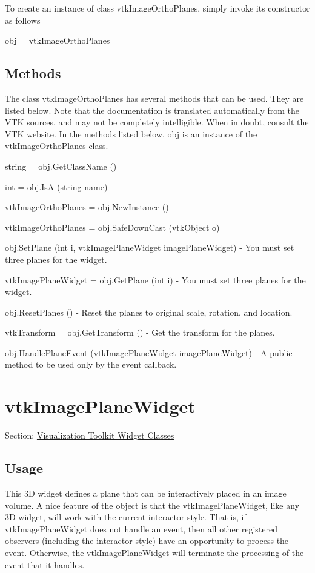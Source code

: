 To create an instance of class vtk\-Image\-Ortho\-Planes, simply invoke its constructor as follows \begin{DoxyVerb}  obj = vtkImageOrthoPlanes
\end{DoxyVerb}
 \hypertarget{vtkwidgets_vtkxyplotwidget_Methods}{}\subsection{Methods}\label{vtkwidgets_vtkxyplotwidget_Methods}
The class vtk\-Image\-Ortho\-Planes has several methods that can be used. They are listed below. Note that the documentation is translated automatically from the V\-T\-K sources, and may not be completely intelligible. When in doubt, consult the V\-T\-K website. In the methods listed below, {\ttfamily obj} is an instance of the vtk\-Image\-Ortho\-Planes class. 
\begin{DoxyItemize}
\item {\ttfamily string = obj.\-Get\-Class\-Name ()}  
\item {\ttfamily int = obj.\-Is\-A (string name)}  
\item {\ttfamily vtk\-Image\-Ortho\-Planes = obj.\-New\-Instance ()}  
\item {\ttfamily vtk\-Image\-Ortho\-Planes = obj.\-Safe\-Down\-Cast (vtk\-Object o)}  
\item {\ttfamily obj.\-Set\-Plane (int i, vtk\-Image\-Plane\-Widget image\-Plane\-Widget)} -\/ You must set three planes for the widget.  
\item {\ttfamily vtk\-Image\-Plane\-Widget = obj.\-Get\-Plane (int i)} -\/ You must set three planes for the widget.  
\item {\ttfamily obj.\-Reset\-Planes ()} -\/ Reset the planes to original scale, rotation, and location.  
\item {\ttfamily vtk\-Transform = obj.\-Get\-Transform ()} -\/ Get the transform for the planes.  
\item {\ttfamily obj.\-Handle\-Plane\-Event (vtk\-Image\-Plane\-Widget image\-Plane\-Widget)} -\/ A public method to be used only by the event callback.  
\end{DoxyItemize}\hypertarget{vtkwidgets_vtkimageplanewidget}{}\section{vtk\-Image\-Plane\-Widget}\label{vtkwidgets_vtkimageplanewidget}
Section\-: \hyperlink{sec_vtkwidgets}{Visualization Toolkit Widget Classes} \hypertarget{vtkwidgets_vtkxyplotwidget_Usage}{}\subsection{Usage}\label{vtkwidgets_vtkxyplotwidget_Usage}
This 3\-D widget defines a plane that can be interactively placed in an image volume. A nice feature of the object is that the vtk\-Image\-Plane\-Widget, like any 3\-D widget, will work with the current interactor style. That is, if vtk\-Image\-Plane\-Widget does not handle an event, then all other registered observers (including the interactor style) have an opportunity to process the event. Otherwise, the vtk\-Image\-Plane\-Widget will terminate the processing of the event that it handles.

